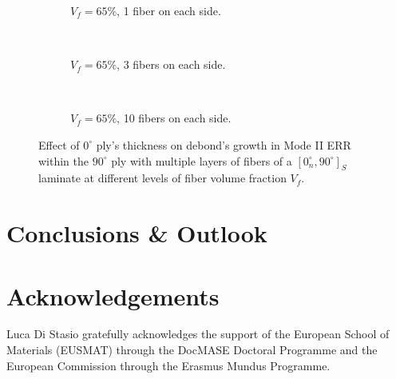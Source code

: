 \documentclass[review]{elsarticle}
\begin{document}
\begin{figure}[!h]
    \begin{subfigure}[b]{0.3\textwidth}
        \caption{$V_{f}=65\%$, 1 fiber on each side.}\label{subfig:sideabovefiber65MIIcase1}
    \end{subfigure} ~
   \begin{subfigure}[b]{0.3\textwidth}
        \caption{$V_{f}=65\%$, 3 fibers on each side.}\label{subfig:sideabovefiber65MIIcase2}
    \end{subfigure} ~
\begin{subfigure}[b]{0.3\textwidth}
        \caption{$V_{f}=65\%$, 10 fibers on each side.}\label{subfig:sideabovefiber65MIIcase3}
    \end{subfigure}

\caption{Effect of $0^{\circ}$ ply's thickness on debond's growth in Mode II ERR within the $90^{\circ}$ ply with multiple layers of fibers of a $\left[0^{\circ}_{n}, 90^{\circ}\right]_{S}$ laminate at different levels of fiber volume fraction $V_{f}$.}\label{fig:sideabovefibersthicknessMII}
\end{figure}

\section{Conclusions \& Outlook}

\section*{Acknowledgements}

Luca Di Stasio gratefully acknowledges the support of the European School of Materials (EUSMAT) through the DocMASE Doctoral Programme and the European Commission through the Erasmus Mundus Programme.


\end{document}
